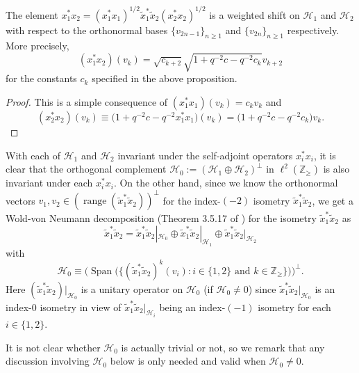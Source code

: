 \begin{corollary}\label{weight_shift} The element $x_{1}^{\ast}x_{2}=( x_{1}^{\ast}x_{1})
^{1/2}\tilde{x}_{1}^{\ast}\tilde{x}_{2}( x_{2}^{\ast}x_{2})
^{1/2}$ is a weighted shift on $\mathcal{H}_{1}$ and $\mathcal{H}_{2}$ with
respect to the orthonormal bases $\{ v_{2n-1}\} _{n\geq1}$ and
$\{ v_{2n}\} _{n\geq1}$ respectively. More precisely,
\[
( x_{1}^{\ast}x_{2}) ( v_{k}) =\sqrt{c_{k+2}}%
\sqrt{1+q^{-2}c-q^{-2}c_{k}}v_{k+2}%
\]
for the constants $c_{k}$ specified in the above proposition.
\end{corollary}
\begin{proof} This is a simple consequence of $( x_{1}^{\ast}x_{1})
( v_{k}) =c_{k}v_{k}$ and
\[
( x_{2}^{\ast}x_{2}) ( v_{k}) \equiv\big(
1+q^{-2}c-q^{-2}x_{1}^{\ast}x_{1}\big) ( v_{k}) =\big(
1+q^{-2}c-q^{-2}c_{k}\big) v_{k} .\tag*{\qed}
\]\renewcommand{\qed}{}
\end{proof}

With each of $\mathcal{H}_{1}$ and $\mathcal{H}_{2}$ invariant under the
self-adjoint operators $x_{i}^{\ast}x_{i}$, it is clear that the orthogonal
complement $\mathcal{H}_{0}:=( \mathcal{H}_{1}\oplus\mathcal{H}%
_{2}) ^{\perp}$ in $\ell^{2}( \mathbb{Z}_{\geq}) $ is also
invariant under each $x_{i}^{\ast}x_{i}$. On the other hand, since we know the
orthonormal vectors $v_{1},v_{2}\in( \operatorname{range}(
\tilde{x}_{1}^{\ast}\tilde{x}_{2}) ) ^{\perp}$ for the
index-$( -2) $ isometry $\tilde{x}_{1}^{\ast}\tilde{x}_{2}$, we
get a Wold-von Neumann decomposition (Theorem 3.5.17 of \cite{Mu}) for the
isometry $\tilde{x}_{1}^{\ast}\tilde{x}_{2}$ as
\[
\tilde{x}_{1}^{\ast}\tilde{x}_{2}=\tilde{x}_{1}^{\ast}\tilde{x}_{2}%
|_{\mathcal{H}_{0}}\oplus\tilde{x}_{1}^{\ast}\tilde{x}_{2}|_{\mathcal{H}_{1}%
}\oplus\tilde{x}_{1}^{\ast}\tilde{x}_{2}|_{\mathcal{H}_{2}}%
\]
with
\[
\mathcal{H}_{0}\equiv\big( \operatorname{Span}\big( \big\{ (
\tilde{x}_{1}^{\ast}\tilde{x}_{2}) ^{k}( v_{i})
\colon i\in\{ 1,2\} \text{ and }k\in\mathbb{Z}_{\geq}\big\} \big)
\big) ^{\perp} .
\]
Here $( \tilde{x}_{1}^{\ast}\tilde{x}_{2}) |_{\mathcal{H}_{0}}$
is a unitary operator on $\mathcal{H}_{0}$ (if $\mathcal{H}_{0}\neq0$) since
$\tilde{x}_{1}^{\ast}\tilde{x}_{2}|_{\mathcal{H}_{0}}$ is an index-$0$
isometry in view of $\tilde{x}_{1}^{\ast}\tilde{x}_{2}|_{\mathcal{H}_{i}}$
being an index-$( -1) $ isometry for each $i\in\{
1,2\} $.

It is not clear whether $\mathcal{H}_{0}$ is actually trivial or not, so we
remark that any discussion involving $\mathcal{H}_{0}$ below is only needed
and valid when $\mathcal{H}_{0}\neq0$.

